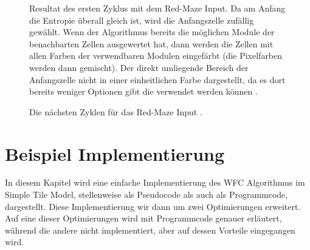 \documentclass[12pt, a4paper,twoside,openany]{report} %
\begin{document}
\begin{figure}[H]
    \centering
    \caption{
        Resultat des ersten Zyklus mit dem Red-Maze Input. Da am Anfang die Entropie überall gleich ist, wird die Anfangszelle zufällig gewählt.
        Wenn der Algorithmus bereits die möglichen Module der benachbarten Zellen ausgewertet hat, dann werden die Zellen mit allen Farben der verwendbaren Modulen eingefärbt
        {(die Pixelfarben werden dann gemischt)}.
        Der direkt umliegende Bereich der Anfangszelle nicht in einer einheitlichen Farbe dargestellt, da es dort bereits weniger Optionen gibt die verwendet werden können \cite{Karth2017WaveFunctionCollapseIC}.
    }%
\end{figure}

\begin{figure}[H]
    \centering
    \caption{Die nächsten Zyklen für das Red-Maze Input \cite{Karth2017WaveFunctionCollapseIC}.}%
\end{figure}

\pagebreak

\section{Beispiel Implementierung}

In diesem Kapitel wird eine einfache Implementierung des WFC Algorithmus im Simple Tile Model, stellenweise als Pseudocode als auch als Programmcode, dargestellt.
Diese Implementierung wir dann um zwei Optimierungen erweitert.
Auf eine dieser Optimierungen wird mit Programmcode genauer erläutert, während die andere nicht implementiert, aber auf dessen Vorteile eingegangen wird.
\end{document}
